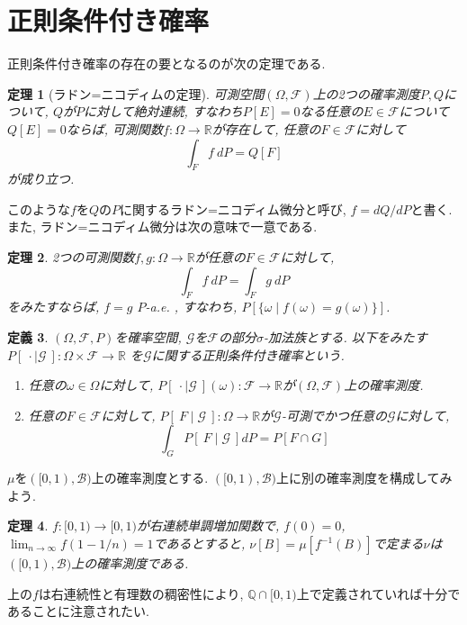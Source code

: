 \documentclass[a4paper,12pt]{jsarticle}
\theoremstyle{break}
\newtheorem{theorem}{定理}
\newtheorem{definition}[theorem]{定義}
\begin{document}
\section{正則条件付き確率}
正則条件付き確率の存在の要となるのが次の定理である.
\begin{theorem}[ラドン=ニコディムの定理]\label{radon}
可測空間$(\Omega,\mathcal{F})$上の2つの確率測度$P,Q$について, $Q$が$P$に対して絶対連続, すなわち$P[E]=0$なる任意の$E\in\mathcal{F}$について$Q[E]=0$ならば, 
可測関数$f:\Omega\to\mathbb{R}$が存在して, 任意の$F\in\mathcal{F}$に対して
\begin{equation*}
\int_F f\ dP =Q[F]
\end{equation*}
が成り立つ.
\end{theorem}
このような$f$を$Q$の$P$に関するラドン=ニコディム微分と呼び, $f=dQ/dP$と書く. また, ラドン=ニコディム微分は次の意味で一意である.
\begin{theorem}\label{ae}
2つの可測関数$f,g:\Omega\to\mathbb{R}$が任意の$F\in\mathcal{F}$に対して, 
\begin{equation*}
\int_F f\ dP = \int_F g\ dP
\end{equation*}
をみたすならば, 
$f=g$ $P$-{\rm a.e.} , すなわち, $P[\{\omega\mid f(\omega)=g(\omega)\}]$.
\end{theorem}
\begin{definition}
$(\Omega,\mathcal{F},P)$を確率空間, $\mathcal{G}$を$\mathcal{F}$の部分$\sigma$-加法族とする. 以下をみたす
$P[\ \cdot\mid\mathcal{G}\ ]:\Omega\times\mathcal{F}\to\mathbb{R}$
を$\mathcal{G}$に関する正則条件付き確率という.
\begin{enumerate}
  \item 任意の$\omega\in\Omega$に対して, $P[\ \cdot\mid\mathcal{G}\ ](\omega):\mathcal{F}\to\mathbb{R}$が$(\Omega,\mathcal{F})$上の確率測度.
  \item 任意の$F\in\mathcal{F}$に対して, $P[\ F\mid\mathcal{G}\ ]:\Omega\to\mathbb{R}$が$\mathcal{G}$-可測でかつ任意の$\mathcal{G}$に対して,
    \begin{equation*}
     \int_G P[\ F\mid\mathcal{G}\ ] dP = P[F\cap G]
    \end{equation*}
\end{enumerate}
\end{definition}

$\mu$を$([0,1),\mathcal{B})$上の確率測度とする. $([0,1),\mathcal{B})$上に別の確率測度を構成してみよう.
\begin{theorem}\label{bunpu}
$f:[0,1)\to[0,1)$が右連続単調増加関数で, $f(0)=0$, $\lim_{n\to\infty}f(1-1/n)=1$であるとすると, $\nu[B]=\mu[f^{-1}(B)]$で定まる$\nu$は$([0,1),\mathcal{B})$上の確率測度である.
\end{theorem}
上の$f$は右連続性と有理数の稠密性により, $\mathbb{Q}\cap[0,1)$上で定義されていれば十分であることに注意されたい.\\
\end{document}
